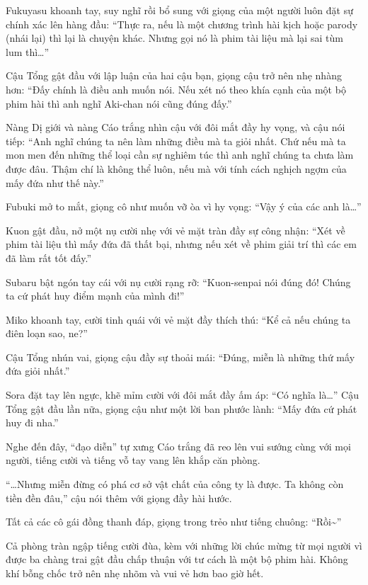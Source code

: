 \documentclass[../main.tex]{subfiles}
\begin{document}
Fukuyasu khoanh tay, suy nghĩ rồi bổ sung với giọng của một người luôn đặt sự chính xác lên hàng đầu: ``Thực ra, nếu là một chương trình hài kịch hoặc parody (nhái lại) thì lại là chuyện khác. Nhưng gọi nó là phim tài liệu mà lại sai tùm lum thì\dots''

Cậu Tổng gật đầu với lập luận của hai cậu bạn, giọng cậu trở nên nhẹ nhàng hơn: ``Đấy chính là điều anh muốn nói. Nếu xét nó theo khía cạnh của một bộ phim hài thì anh nghĩ Aki-chan nói cũng đúng đấy.''

Nàng Dị giới và nàng Cáo trắng nhìn cậu với đôi mắt đầy hy vọng, và cậu nói tiếp: ``Anh nghĩ chúng ta nên làm những điều mà ta giỏi nhất. Chứ nếu mà ta mon men đến những thể loại cần sự nghiêm túc thì anh nghĩ chúng ta chưa làm được đâu. Thậm chí là không thể luôn, nếu mà với tính cách nghịch ngợm của mấy đứa như thế này.''

Fubuki mở to mắt, giọng cô như muốn vỡ òa vì hy vọng: ``Vậy ý của các anh là\dots''

Kuon gật đầu, nở một nụ cười nhẹ với vẻ mặt tràn đầy sự công nhận: ``Xét về phim tài liệu thì mấy đứa đã thất bại, nhưng nếu xét về phim giải trí thì các em đã làm rất tốt đấy.''

Subaru bật ngón tay cái với nụ cười rạng rỡ: ``Kuon-senpai nói đúng đó! Chúng ta cứ phát huy điểm mạnh của mình đi!''

Miko khoanh tay, cười tinh quái với vẻ mặt đầy thích thú: ``Kể cả nếu chúng ta điên loạn sao, ne?''

Cậu Tổng nhún vai, giọng cậu đầy sự thoải mái: ``Đúng, miễn là những thứ mấy đứa giỏi nhất.''

Sora đặt tay lên ngực, khẽ mỉm cười với đôi mắt đầy ấm áp: ``Có nghĩa là\dots'' Cậu Tổng gật đầu lần nữa, giọng cậu như một lời ban phước lành: ``Mấy đứa cứ phát huy đi nha.''

Nghe đến đây, ``đạo diễn'' tự xưng Cáo trắng đã reo lên vui sướng cùng với mọi người, tiếng cười và tiếng vỗ tay vang lên khắp căn phòng.

``\dots Nhưng miễn đừng có phá cơ sở vật chất của công ty là được. Ta không còn tiền đền đâu,'' cậu nói thêm với giọng đầy hài hước.

Tất cả các cô gái đồng thanh đáp, giọng trong trẻo như tiếng chuông: ``Rồi\~{}''

Cả phòng tràn ngập tiếng cười đùa, kèm với những lời chúc mừng từ mọi người vì được ba chàng trai gật đầu chấp thuận với tư cách là một bộ phim hài. Không khí bỗng chốc trở nên nhẹ nhõm và vui vẻ hơn bao giờ hết.
\end{document}
